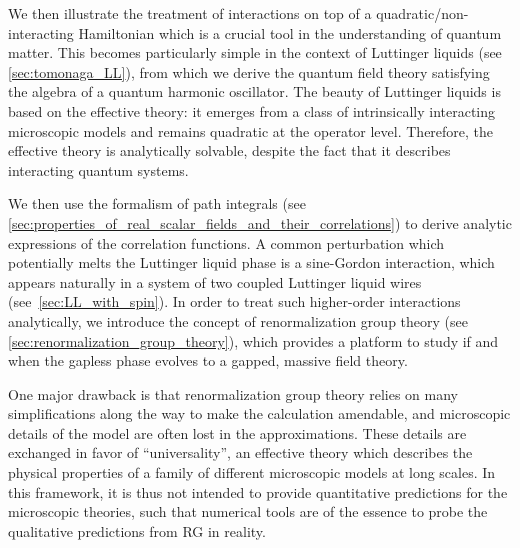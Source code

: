We then illustrate the treatment of interactions on top of a quadratic/non-interacting Hamiltonian which is a crucial tool in the understanding of quantum matter.
This becomes particularly simple in the context of Luttinger liquids (see \cref{sec:tomonaga_LL}), from which we derive the quantum field theory satisfying the algebra of a quantum harmonic oscillator.
The beauty of Luttinger liquids is based on the effective theory: it emerges from a class of intrinsically interacting microscopic models and remains quadratic at the operator level.
Therefore, the effective theory is analytically solvable, despite the fact that it describes interacting quantum systems.

We then use the formalism of path integrals (see \cref{sec:properties_of_real_scalar_fields_and_their_correlations}) to derive analytic expressions of the correlation functions.
A common perturbation which potentially melts the Luttinger liquid phase is a sine-Gordon interaction, which appears naturally in a system of two coupled Luttinger liquid wires (see~\cref{sec:LL_with_spin}).
In order to treat such higher-order interactions analytically, we introduce the concept of renormalization group theory (see \cref{sec:renormalization_group_theory}), which provides a platform to study if and when the gapless phase evolves to a gapped, massive field theory.

One major drawback is that renormalization group theory relies on many simplifications along the way to make the calculation amendable, and microscopic details of the model are often lost in the approximations.
These details are exchanged in favor of ``universality'', an effective theory which describes the physical properties of a family of different microscopic models at long scales.
In this framework, it is thus not intended to provide quantitative predictions for the microscopic theories, such that numerical tools are of the essence to probe the qualitative predictions from RG in reality.

